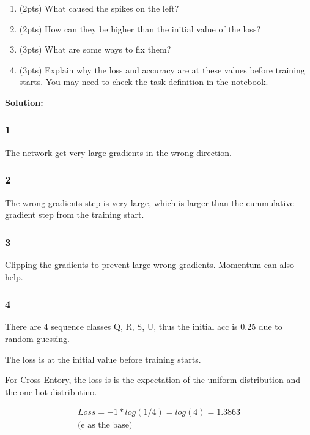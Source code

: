 \begin{enumerate}
    \item (2pts) What caused the spikes on the left?
    \item (2pts) How can they be higher than the initial value of the loss?
    \item (3pts) What are some ways to fix them?
    \item (3pts) Explain why the loss and accuracy are at these values before training starts. You may need to check the task definition in the notebook.
\end{enumerate}

\textbf{Solution:}
\subsubsection*{1}
The network get very large gradients in the wrong direction.

\subsubsection*{2}
The wrong gradients step is very large, which is larger than the cummulative gradient step from the training start.
\subsubsection*{3}
Clipping the gradients to prevent large wrong gradients. Momentum can also help.

\subsubsection*{4}
There are 4 sequence classes Q, R, S, U, thus the initial acc is 0.25 due to random guessing.

The loss is at the initial value before training starts.

For Cross Entory, the loss is is the expectation of the uniform distribution and the one hot distributino.

\begin{align}
    Loss  =  - 1 * log(1/4)
          =  log(4)
          =  1.3863 \\ \text{(e as the base)}
\end{align}
